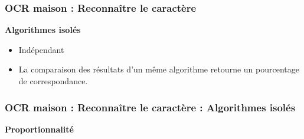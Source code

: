 \documentclass[xcolor=dvipsnames]{beamer}
\begin{document}
\begin{frame}
  \frametitle{OCR maison : Reconnaître le caractère}

  \begin{center}\begin{alertblock}{}
    \begin{center}\textbf{\Large Algorithmes isolés}\end{center}
  \end{alertblock}\end{center}
  
  \begin{itemize}[<+->]
   \item Indépendant
   \item La comparaison des résultats d'un même algorithme retourne un pourcentage de correspondance.
  \end{itemize}
\end{frame}


\begin{frame}
  \frametitle{OCR maison : Reconnaître le caractère : Algorithmes isolés}

  \begin{center}\begin{alertblock}{}
    \begin{center}\textbf{\Large Proportionnalité}\end{center}
  \end{alertblock}\end{center}

  \begin{center}
  \end{center}
  
\end{frame}
\end{document}
